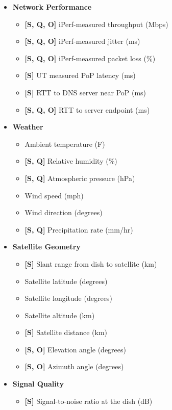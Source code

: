 \documentclass[12pt]{article}
\begin{document}
\begin{itemize}
    \item \textbf{Network Performance}
    \begin{itemize}
        \item \textbf{[S, Q, O]} iPerf-measured throughput (Mbps)
        \item \textbf{[S, Q, O]} iPerf-measured jitter (ms)
        \item \textbf{[S, Q, O]} iPerf-measured packet loss (\%)
        \item \textbf{[S]} UT measured PoP latency (ms)
        \item \textbf{[S]} RTT to DNS server near PoP (ms)
        \item \textbf{[S, Q, O]} RTT to server endpoint (ms)
        
    \end{itemize}
    \item \textbf{Weather}
    \begin{itemize}
        \item Ambient temperature (\textdegree F)
        \item \textbf{[S, Q]} Relative humidity (\%)
        \item \textbf{[S, Q]} Atmospheric pressure (hPa)
        \item Wind speed (mph)
        \item Wind direction (degrees)
        \item \textbf{[S, Q]} Precipitation rate (mm/hr)
    \end{itemize}
    \item \textbf{Satellite Geometry}
    \begin{itemize}
        \item \textbf{[S]} Slant range from dish to satellite (km)
        \item Satellite latitude (degrees)
        \item Satellite longitude (degrees)
        \item Satellite altitude (km)
        \item \textbf{[S]} Satellite distance (km)
        \item \textbf{[S, O]} Elevation angle (degrees)
        \item \textbf{[S, O]} Azimuth angle (degrees)
    \end{itemize}
    \item \textbf{Signal Quality}
    \begin{itemize}
        \item \textbf{[S]} Signal-to-noise ratio at the dish (dB)

\end{itemize}
\end{itemize}
\end{document}
